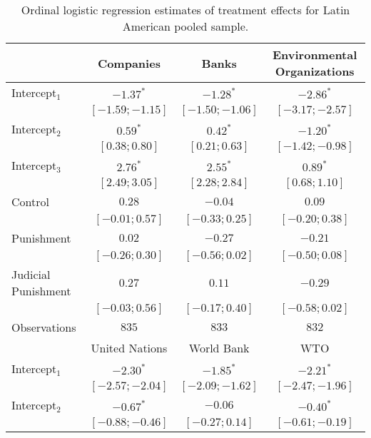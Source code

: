 \begin{table}[h]
\begin{center}
\caption{Ordinal logistic regression estimates of treatment effects for Latin American pooled sample.}
\begin{threeparttable}
\begin{tabular}{l c c c}
\hline
 & Companies & Banks & Environmental
Organizations \\
\hline
Intercept$_1$       & $-1.37^{*}$       & $-1.28^{*}$       & $-2.86^{*}$       \\
                    & $ [-1.59; -1.15]$ & $ [-1.50; -1.06]$ & $ [-3.17; -2.57]$ \\
Intercept$_2$       & $0.59^{*}$        & $0.42^{*}$        & $-1.20^{*}$       \\
                    & $ [ 0.38;  0.80]$ & $ [ 0.21;  0.63]$ & $ [-1.42; -0.98]$ \\
Intercept$_3$       & $2.76^{*}$        & $2.55^{*}$        & $0.89^{*}$        \\
                    & $ [ 2.49;  3.05]$ & $ [ 2.28;  2.84]$ & $ [ 0.68;  1.10]$ \\
Control             & $0.28$            & $-0.04$           & $0.09$            \\
                    & $ [-0.01;  0.57]$ & $ [-0.33;  0.25]$ & $ [-0.20;  0.38]$ \\
Punishment          & $0.02$            & $-0.27$           & $-0.21$           \\
                    & $ [-0.26;  0.30]$ & $ [-0.56;  0.02]$ & $ [-0.50;  0.08]$ \\
Judicial Punishment & $0.27$            & $0.11$            & $-0.29$           \\
                    & $ [-0.03;  0.56]$ & $ [-0.17;  0.40]$ & $ [-0.58;  0.02]$ \\
\hline
Observations        & $835$             & $833$             & $832$             \\
\hline
 & United Nations & World Bank & WTO \\
\hline
Intercept$_1$       & $-2.30^{*}$       & $-1.85^{*}$       & $-2.21^{*}$       \\
                    & $ [-2.57; -2.04]$ & $ [-2.09; -1.62]$ & $ [-2.47; -1.96]$ \\
Intercept$_2$       & $-0.67^{*}$       & $-0.06$           & $-0.40^{*}$       \\
                    & $ [-0.88; -0.46]$ & $ [-0.27;  0.14]$ & $ [-0.61; -0.19]$ \\

\end{tabular}
\end{threeparttable}
\end{center}
\end{table}
